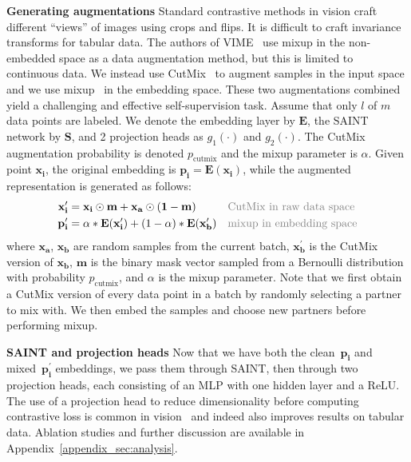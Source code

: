 \documentclass{article}
\begin{document}
\textbf{Generating augmentations} Standard contrastive methods in vision craft different ``views'' of images using crops and flips. It is difficult to craft invariance transforms for tabular data.
The authors of VIME~\citep{yoon2020vime} use mixup in the non-embedded space as a data augmentation method, but this is limited to continuous data.
We instead use CutMix~\citep{yun2019cutmix} to augment samples in the input space and we use mixup~\citep{zhang2017mixup} in the embedding space.  %
These two augmentations combined yield a challenging and effective self-supervision task.
Assume that only $l$ of $m$ data points are labeled.  We denote the embedding layer by $\mathbf{E}$, the SAINT network by $\mathbf{S}$, and 2 projection heads as $g_1(\cdot)$ and $g_2(\cdot)$. The CutMix augmentation probability is denoted $p_{\text{cutmix}}$ and the mixup parameter is $\alpha$.
Given point $\mathbf{x_i}$, the original embedding is $\mathbf{p_i} = \mathbf{E}(\mathbf{x_i})$, while the augmented representation is generated as follows:
\begin{align}
\mathbf{x_i^\prime} &= \mathbf{x_i}\odot \mathbf{m} + \mathbf{x_a}\odot \mathbf{(1-m)} && \textcolor{gray}{\text{CutMix in raw data space}}\\
\mathbf{p_i^\prime} &= \alpha*\mathbf{E}(\mathbf{x_i^\prime}) +(1-\alpha)*\mathbf{E}(\mathbf{x_b^\prime})&& \textcolor{gray}{\text{mixup in embedding space}}
\end{align}
where $\mathbf{x_a}$, $\mathbf{x_b}$ are random samples from the current batch, $\mathbf{x_b^\prime}$ is the CutMix version of $\mathbf{x_b}$, $\mathbf{m}$ is the binary mask vector sampled from a Bernoulli distribution with probability $p_{\text{cutmix}}$, and $\alpha$ is the mixup parameter. Note that we first obtain a CutMix version of every data point in a batch by randomly selecting a partner to mix with. We then embed the samples and choose new partners before performing mixup. 



\textbf{SAINT and projection heads} Now that we have both the clean~$\mathbf{p_i}$ and mixed~$\mathbf{p_i^\prime}$ embeddings, we pass them through SAINT, then through two projection heads, each consisting of an MLP with one hidden layer and a ReLU. The use of a projection head to reduce dimensionality before computing contrastive loss is common in vision~\citep{chen2020simple,he2020momentum,grill2020bootstrap} and indeed also improves results on tabular data. Ablation studies and further discussion are available in Appendix~\ref{appendix_sec:analysis}.
\end{document}
